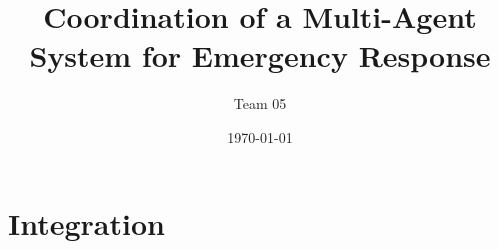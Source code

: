 \documentclass{beamer}
\title{Coordination of a Multi-Agent System for Emergency Response}
\author{Team 05}
\date{\today}
\begin{document}




















\section{Integration}





\end{document}
